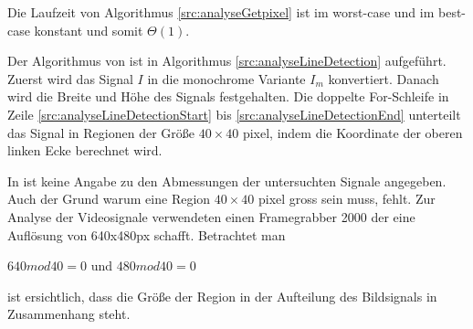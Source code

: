 

Die Laufzeit von Algorithmus \ref{src:analyseGetpixel} ist im worst-case und im best-case konstant und somit $\Theta(1)$.

Der Algorithmus von \citeauthor{clarke96} ist in Algorithmus \ref{src:analyseLineDetection} aufgeführt. Zuerst wird das Signal $I$ in die monochrome Variante $I_m$ konvertiert. Danach wird die Breite und Höhe des Signals festgehalten. Die doppelte For-Schleife in Zeile \ref{src:analyseLineDetectionStart} bis \ref{src:analyseLineDetectionEnd} unterteilt das Signal in Regionen der Größe $40 \times 40$ \gls{pixel}, indem die Koordinate der oberen linken Ecke berechnet wird.

In \citeauthor{clarke96} ist keine Angabe zu den Abmessungen der untersuchten Signale angegeben. Auch der Grund warum eine Region $40 \times 40$ \gls{pixel} gross sein muss, fehlt. Zur Analyse der Videosignale verwendeten \citeauthor{clarke96} einen Framegrabber 2000 der eine Auflösung von 640x480px schafft. Betrachtet man

$640 mod 40 = 0$ und $480 mod 40 = 0$

ist ersichtlich, dass die Größe der Region in der Aufteilung des Bildsignals in Zusammenhang steht.







